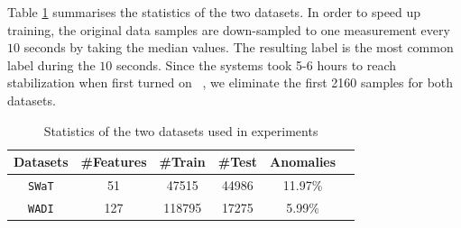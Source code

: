 \documentclass[letterpaper]{article} %
\begin{document}
Table \ref{table:dataset} summarises the statistics of the two datasets. In order to speed up training, the original data samples are down-sampled to one measurement every $10$ seconds by taking the median values. The resulting label is the most common label during the $10$ seconds. Since the systems took 5-6 hours to reach stabilization when first turned on  ~\cite{goh2016dataset}, we eliminate the first 2160 samples for both datasets.
\begin{table}[t]
    \centering
    \begin{tabular}{ cccccc } 
     \toprule
        \textbf{Datasets} & \textbf{\#Features} & \textbf{\#Train} & \textbf{\#Test} & \textbf{Anomalies} \\
     \midrule
        \texttt{SWaT} & 51 & 47515 & 44986 & 11.97\% \\
        \texttt{WADI} & 127 & 118795 & 17275 & 5.99\% \\
     \bottomrule
    \end{tabular}
    \caption{Statistics of the two datasets used in experiments}
    \label{table:dataset}
\end{table}
\end{document}

